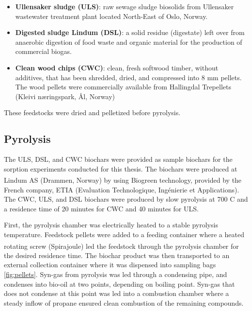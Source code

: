 \begin{itemize}
    \item \textbf{Ullensaker sludge (\acrshort{ULS})}: raw sewage sludge biosolids from Ullensaker wastewater treatment plant located North-East of Oslo, Norway. 
    \item \textbf{Digested sludge Lindum (\acrshort{DSL})}: a solid residue (digestate) left over from anaerobic digestion of food waste and organic material for the production of commercial biogas.
    \item \textbf{Clean wood chips (\acrshort{CWC})}: clean, fresh softwood timber, without additives, that has been shredded, dried, and compressed into 8 mm pellets. The wood pellets were commercially available from Hallingdal Trepellets (Kleivi næringspark, Ål, Norway)
\end{itemize}

These feedstocks were dried and pelletized before pyrolysis.

\subsection{Pyrolysis}
The ULS, DSL, and CWC biochars were provided as sample biochars for the sorption experiments conducted for this thesis. The biochars were produced at Lindum AS (Drammen, Norway) by using Biogreen\textsuperscript{\textcopyright} technology, provided by the French company, ETIA (Evaluation Technologique, Ingénierie et Applications). The CWC, ULS, and DSL biochars were produced by slow pyrolysis at 700 \textdegree C and a residence time of 20 minutes for CWC and 40 minutes for ULS. 

First, the pyrolysis chamber was electrically heated to a stable pyrolysis temperature. Feedstock pellets were added to a feeding container where a heated rotating screw (Spirajoule\textsuperscript{\textregistered}) led the feedstock through the pyrolysis chamber for the desired residence time. The biochar product was then transported to an external collection container where it was dispensed into sampling bags \cref{fig:pellets}. Syn-gas from pyrolysis was led through a condensing pipe, and condenses into bio-oil at two points, depending on boiling point. Syn-gas that does not condense at this point was led into a combustion chamber where a steady inflow of propane ensured clean combustion of the remaining compounds.

